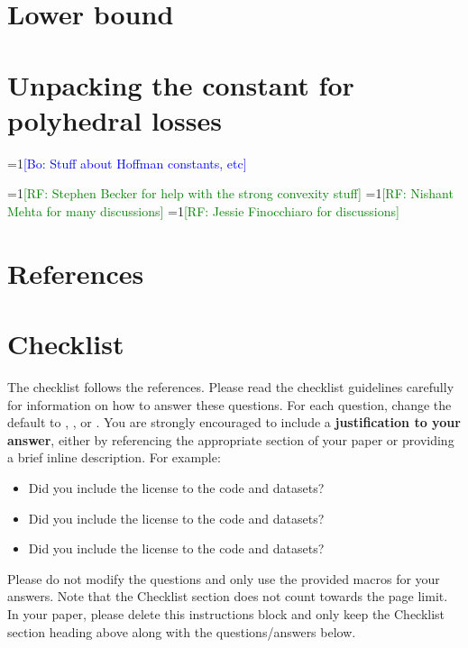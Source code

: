 \documentclass{article}
\newcommand{\Comments}{1}
\newcommand{\mynote}[2]{\ifnum\Comments=1\textcolor{#1}{#2}\fi}
\newcommand{\raf}[1]{\mynote{green}{[RF: #1]}}
\newcommand{\bo}[1]{\mynote{blue}{[Bo: #1]}}
\begin{document}
\section{Lower bound}




\section{Unpacking the constant for polyhedral losses}

\bo{Stuff about Hoffman constants, etc}




\begin{ack}
  \raf{Stephen Becker for help with the strong convexity stuff}
  \raf{Nishant Mehta for many discussions}
  \raf{Jessie Finocchiaro for discussions}
\end{ack}

\section*{References}




\section*{Checklist}

The checklist follows the references.  Please
read the checklist guidelines carefully for information on how to answer these
questions.  For each question, change the default \answerTODO{} to \answerYes{},
\answerNo{}, or \answerNA{}.  You are strongly encouraged to include a {\bf
justification to your answer}, either by referencing the appropriate section of
your paper or providing a brief inline description.  For example:
\begin{itemize}
  \item Did you include the license to the code and datasets? 
  \item Did you include the license to the code and datasets? 
  \item Did you include the license to the code and datasets? \answerNA{}
\end{itemize}
Please do not modify the questions and only use the provided macros for your
answers.  Note that the Checklist section does not count towards the page
limit.  In your paper, please delete this instructions block and only keep the
Checklist section heading above along with the questions/answers below.
\end{document}
